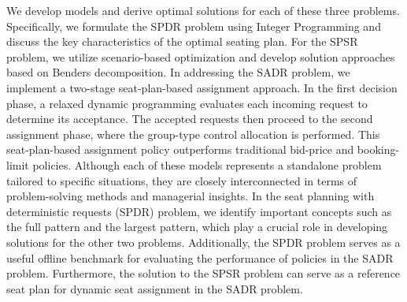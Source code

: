 

We develop models and derive optimal solutions for each of these three problems. Specifically, we formulate the SPDR problem using Integer Programming and discuss the key characteristics of the optimal seating plan. For the SPSR problem, we utilize scenario-based optimization and develop solution approaches based on Benders decomposition. In addressing the SADR problem, we implement a two-stage seat-plan-based assignment approach. In the first decision phase, a relaxed dynamic programming evaluates each incoming request to determine its acceptance. The accepted requests then proceed to the second assignment phase, where the group-type control allocation is performed. This seat-plan-based assignment policy outperforms traditional bid-price and booking-limit policies. Although each of these models represents a standalone problem tailored to specific situations, they are closely interconnected in terms of problem-solving methods and managerial insights. In the seat planning with deterministic requests (SPDR) problem, we identify important concepts such as the full pattern and the largest pattern, which play a crucial role in developing solutions for the other two problems. Additionally, the SPDR problem serves as a useful offline benchmark for evaluating the performance of policies in the SADR problem. Furthermore, the solution to the SPSR problem can serve as a reference seat plan for dynamic seat assignment in the SADR problem.




